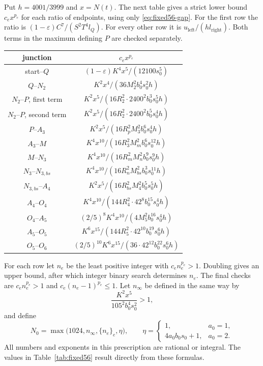\documentclass[12pt]{article}
\numberwithin{equation}{section}
\begin{document}
Put $h=4001/3999$ and $x=N(t)$.
The next table gives a strict lower bound $c_ex^{p_e}$ for each
ratio of endpoints, using only \eqref{eq:fixed56-gap}.
For the first row the ratio is $(1-\varepsilon)C^7/(S^2T^4l_Q)$.
For every other row it is $u_{\mathrm{left}}/(hl_{\mathrm{right}})$.
Both terms in the maximum defining $P$ are checked separately.
\begin{center}\small
\begin{tabular}{c|c}
junction&$c_ex^{p_e}$\\\hline
start--$Q$&$(1-\varepsilon)K^4x^5/(12100s_0^5)$\\
$Q$--$N_2$&$K^2x^4/(36M_2^2b_0^4s_0^2h)$\\
$N_2$--$P$, first term&$K^2x^5/(16R_2^2\cdot2400^2b_0^3s_0^5h)$\\
$N_2$--$P$, second term&$K^2x^5/(16R_2^2\cdot2400^2b_0^5s_0^4h)$\\
$P$--$A_3$&$K^2x^5/(16R_p^2M_3^2b_0^6s_0^4h)$\\
$A_3$--$M$&$K^4x^{10}/(16R_3^2M_m^2b_0^6s_0^{12}h)$\\
$M$--$N_3$&$K^4x^{10}/(16R_m^2M_n^2b_0^9s_0^9h)$\\
$N_3$--$N_{3,bs}$&$K^4x^{10}/(16R_n^2M_{bs}^2b_0^3s_0^{11}h)$\\
$N_{3,bs}$--$A_4$&$K^2x^5/(16R_{bs}^2M_4^2b_0^5s_0^5h)$\\
$A_4$--$O_4$&$K^4x^{10}/(144R_4^2\cdot42^8b_0^{15}s_0^4h)$\\
$O_4$--$A_5$&$(2/5)^8K^4x^{10}/(4M_5^2b_0^{16}s_0^4h)$\\
$A_5$--$O_5$&$K^6x^{15}/(144R_5^2\cdot42^{10}b_0^{19}s_0^6h)$\\
$O_5$--$O_6$&$(2/5)^{10}K^6x^{15}/(36\cdot42^{12}b_0^{22}s_0^6h)$
\end{tabular}
\end{center}
For each row let $n_e$ be the least positive integer with $c_en_e^{p_e}>1$.
Doubling gives an upper bound, after which integer binary search
determines $n_e$. The final checks are $c_en_e^{p_e}>1$ and
$c_e(n_e-1)^{p_e}\le1$.
Let $n_\infty$ be defined in the same way by
\[
 \frac{K^2x^5}{105^2b_0^4s_0^2}>1,
\]
and define
\begin{equation}\label{eq:fixed56-cutoff}
 N_0=\max\bigl(1024,n_\infty,\{n_e\}_e,\eta\bigr),\qquad
 \eta=\begin{cases}1,&a_0=1,\\4a_0b_0s_0+1,&a_0=2.\end{cases}
\end{equation}
All numbers and exponents in this prescription are rational or integral.
The values in Table~\ref{tab:fixed56} result directly from these formulas.
\end{document}

